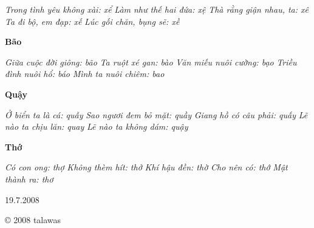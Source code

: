 \documentclass[../main.tex]{subfiles}
\begin{document}
\begin{multicols}{2}
\begin{blockquote}
\textit{Trong tình yêu không xài: xể}        
\textit{Làm như thế hai đứa: xệ}        
\textit{Thà rằng giận nhau, ta: xê}        
\textit{Ta đi bộ, em đạp: xế} 
\textit{Lúc gối chăn, bụng sẽ: xề} 
 
\textbf{Bão} 
        
\textit{Giữa cuộc đời giông: bão}        
\textit{Ta ruột xé gan: bào}        
\textit{Văn miếu nuôi cường: bạo}        
\textit{Triều đình nuôi hổ: báo} 
\textit{Mình ta nuôi chiêm: bao} 
 
\textbf{Quậy} 
        
\textit{Ở biển ta là cá: quẫy}        
\textit{Sao ngươi đem bỏ mặt: quầy}        
\textit{Giang hồ có câu phải: quấy}        
\textit{Lẽ nào ta chịu lăn: quay} 
\textit{Lẽ nào ta không dám: quậy} 
 
\textbf{Thớ} 
        
\textit{Có con ong: thợ}        
\textit{Không thèm hít: thở}        
\textit{Khí hậu đền: thờ}        
\textit{Cho nên có: thớ} 
\textit{Mật thành ra: thơ} 

\end{blockquote}
 
19.7.2008 
 
© 2008 talawas 
\end{multicols}
\end{document}
